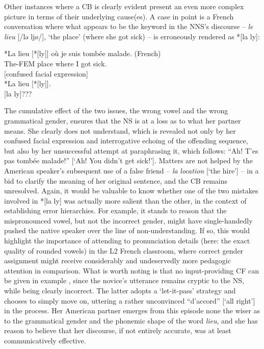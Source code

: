 \documentclass[output=paper,colorlinks,citecolor=brown,modfonts,nonflat]{../langscibook}
\begin{document}
Other instances where a CB is clearly evident present an even more complex picture in terms of their underlying cause(es). A case in point is a French conversation where what appears to be the keyword in the NNS’s discourse – \textit{le} \textit{lieu} [/lə ljø/], ‘the place’ (where she got sick) – is erroneously rendered as *[la ly]:

\ea\label{ex:scheuer:20}
{\NNS} *{La}  {lieu} [*[ly]]  {où} {je} {suis} {tombée} {malade.}   (French)\\
The-FEM  place  where I got        sick. \\
{\NS} [confused facial expression] \\
{\NNS} *{La} {lieu} [*[ly]].\\
{\NS} [la ly]???\\
\z

The cumulative effect of the two issues, the wrong vowel and the wrong grammatical gender, ensures that the NS is at a loss as to what her partner means. She clearly does not understand, which is revealed not only by her confused facial expression and interrogative echoing of the offending sequence, but also by her unsuccessful attempt at paraphrasing it, which follows: “Ah! T’es pas tombée malade!” [‘Ah! You didn’t get sick!’]. Matters are not helped by the American speaker’s subsequent use of a false friend – \textit{la} \textit{location} [‘the hire’] – in a bid to clarify the meaning of her original sentence, and the CB remains unresolved. Again, it would be valuable to know whether one of the two mistakes involved in *[la ly] was actually more salient than the other, in the context of establishing error hierarchies. For example, it stands to reason that the mispronounced vowel, but not the incorrect gender, might have single-handedly pushed the native speaker over the line of non-understanding. If so, this would highlight the importance of attending to pronunciation details (here: the exact quality of rounded vowels) in the L2 French classroom, where correct gender assignment might receive considerably and undeservedly more pedagogic attention in comparison. What is worth noting is that no input-providing CF can be given in example , since the novice’s utterance remains cryptic to the NS, while being clearly incorrect. The latter adopts a ‘let-it-pass’ strategy and chooses to simply move on, uttering a rather unconvinced “d’accord” [‘all right’] in the process. Her American partner emerges from this episode none the wiser as to the grammatical gender and the phonemic shape of the word \textit{lieu}, and she has reason to believe that her discourse, if not entirely accurate, was at least communicatively effective.
\end{document}
